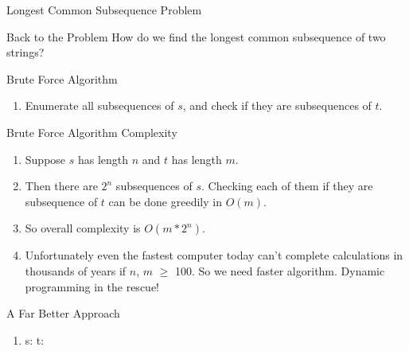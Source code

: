 \documentclass{beamer}
\begin{document}
\begin{frame}{Longest Common Subsequence Problem}
\begin{block}{Back to the Problem}
How do we find the longest common subsequence of two strings?
\end{block}
\end{frame}

\begin{frame}{Brute Force Algorithm}
\begin{enumerate}
    \onslide\item<1-> Enumerate all subsequences of $s$, and check if they are subsequences of $t$.
\end{enumerate}
\end{frame}


\begin{frame}{Brute Force Algorithm Complexity}
\begin{enumerate}
    \onslide\item<1-> Suppose $s$ has length $n$ and $t$ has length $m$.
    \onslide\item<2-> Then there are $2^n$ subsequences of $s$. Checking each of them if they are subsequence of $t$ can be done greedily in $O(m)$. 
    \onslide\item<3-> So overall complexity is $O(m*2^n)$.
    \onslide\item<3-> Unfortunately even the fastest computer today can't complete calculations in thousands of years if $n$, $m$ $\geq$ 100. So we need faster algorithm. Dynamic programming in the rescue!
\end{enumerate}
\end{frame}



\begin{frame}{A Far Better Approach}
\begin{enumerate}
    \onslide\item<1-> s: t:
\end{enumerate}
\end{frame}
\end{document}

